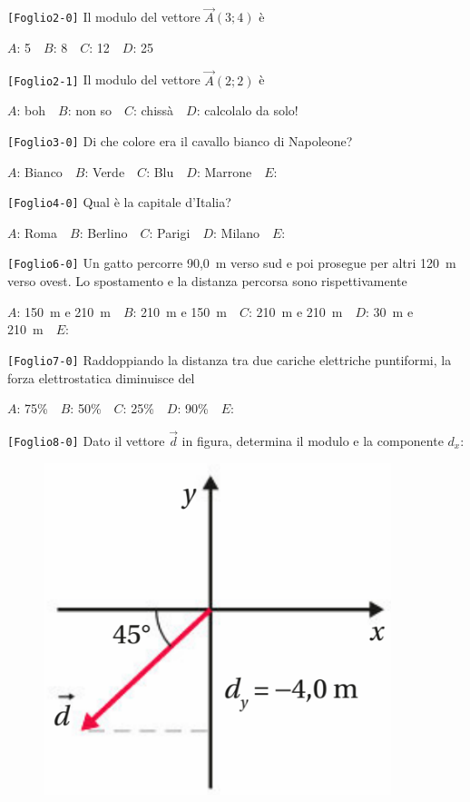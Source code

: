 

\noindent
{\tt [{Foglio2-0}]} Il modulo del vettore $\vec{A}(3;4)$ è

{$A$}: 5\ \ 
{$B$}: 8\ \ 
{$C$}: 12\ \ 
{$D$}: 25\ \ 


\noindent
{\tt [{Foglio2-1}]} Il modulo del vettore $\vec{A}(2;2)$ è

{$A$}: boh\ \ 
{$B$}: non so\ \ 
{$C$}: chissà\ \ 
{$D$}: calcolalo da solo!\ \ 


\noindent
{\tt [{Foglio3-0}]} Di che colore era il cavallo bianco di Napoleone?

{$A$}: Bianco\ \ 
{$B$}: Verde\ \ 
{$C$}: Blu\ \ 
{$D$}: Marrone\ \ 
{$E$}: \ \ 


\noindent
{\tt [{Foglio4-0}]} Qual è la capitale d’Italia?

{$A$}: Roma\ \ 
{$B$}: Berlino\ \ 
{$C$}: Parigi\ \ 
{$D$}: Milano\ \ 
{$E$}: \ \ 


\noindent
{\tt [{Foglio6-0}]} Un gatto percorre 90,0~m verso sud e poi prosegue per altri 120~m verso ovest. Lo spostamento e la distanza percorsa sono rispettivamente

{$A$}: 150~m e 210~m\ \ 
{$B$}: 210~m e 150~m\ \ 
{$C$}: 210~m e 210~m\ \ 
{$D$}: 30~m e 210~m\ \ 
{$E$}: \ \ 


\noindent
{\tt [{Foglio7-0}]} Raddoppiando la distanza tra due cariche elettriche puntiformi, la forza elettrostatica diminuisce del

{$A$}: 75\%\ \ 
{$B$}: 50\%\ \ 
{$C$}: 25\%\ \ 
{$D$}: 90\%\ \ 
{$E$}: \ \ 


\noindent
{\tt [{Foglio8-0}]} Dato il vettore $\vec{d}$ in figura, determina il modulo e la componente $d_x$: \begin{figure}[h!]   \begin{center}     \includegraphics[scale=0.35]{vettored.png}   \end{center} \end{figure}

